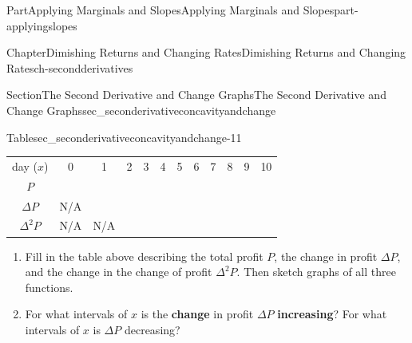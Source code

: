 \documentclass[oneside,10pt,]{tufte-book}
\newcommand{\tabularfont}{\relax}
\newcommand{\terminology}[1]{\textbf{#1}}
\numberwithin{equation}{chapter}
\def \tikzhistogram (#1,#2){\draw[fill=blue,opacity=0.3] ({#1+((\xtwo-\xmin)/5)},#2) rectangle ({#1-((\xtwo-\xmin)/5)},0); \draw[draw,thick] ({#1+((\xtwo-\xmin)/5)},#2) rectangle ({#1-((\xtwo-\xmin)/5)},0); \node[draw,fill=blue, circle,inner sep=2.5pt] at (#1,#2) {};}
\begin{document}
\begin{partptx}{Part}{Applying Marginals and Slopes}{}{Applying Marginals and Slopes}{}{}{part-applyingslopes}
\begin{chapterptx}{Chapter}{Dimishing Returns and Changing Rates}{}{Dimishing Returns and Changing Rates}{}{}{ch-secondderivatives}
\begin{sectionptx}{Section}{The Second Derivative and Change Graphs}{}{The Second Derivative and Change Graphs}{}{}{sec_seconderivativeconcavityandchange}
\begin{image}{0}{1}{0}{}
{
}%
\end{image}%
\begin{tableptx}{Table}{\textbf{}}{sec_seconderivativeconcavityandchange-11}{}%
\centering%
{\tabularfont%
\begin{tabular}{llllllllllll}
\multicolumn{1}{c}{day (\(x\))}&\multicolumn{1}{c}{0}&\multicolumn{1}{c}{1}&\multicolumn{1}{c}{2}&\multicolumn{1}{c}{3}&\multicolumn{1}{c}{4}&\multicolumn{1}{c}{5}&\multicolumn{1}{c}{6}&\multicolumn{1}{c}{7}&\multicolumn{1}{c}{8}&\multicolumn{1}{c}{9}&\multicolumn{1}{c}{10}\tabularnewline[0pt]
\multicolumn{1}{c}{\(P\)}&\multicolumn{1}{c}{}&\multicolumn{1}{c}{}&\multicolumn{1}{c}{}&\multicolumn{1}{c}{}&\multicolumn{1}{c}{}&\multicolumn{1}{c}{}&\multicolumn{1}{c}{}&\multicolumn{1}{c}{}&\multicolumn{1}{c}{}&\multicolumn{1}{c}{}&\multicolumn{1}{c}{}\tabularnewline[0pt]
\multicolumn{1}{c}{\(\Delta P\)}&\multicolumn{1}{c}{N\slash{}A}&\multicolumn{1}{c}{}&\multicolumn{1}{c}{}&\multicolumn{1}{c}{}&\multicolumn{1}{c}{}&\multicolumn{1}{c}{}&\multicolumn{1}{c}{}&\multicolumn{1}{c}{}&\multicolumn{1}{c}{}&\multicolumn{1}{c}{}&\multicolumn{1}{c}{}\tabularnewline[0pt]
\multicolumn{1}{c}{\(\Delta^2 P\)}&\multicolumn{1}{c}{N\slash{}A}&\multicolumn{1}{c}{N\slash{}A}&\multicolumn{1}{c}{}&\multicolumn{1}{c}{}&\multicolumn{1}{c}{}&\multicolumn{1}{c}{}&\multicolumn{1}{c}{}&\multicolumn{1}{c}{}&\multicolumn{1}{c}{}&\multicolumn{1}{c}{}&\multicolumn{1}{c}{}
\end{tabular}
}%
\end{tableptx}%
%
\begin{enumerate}
\item{}Fill in the table above describing the total profit \(P\), the change in profit \(\Delta P\), and the change in the change of profit \(\Delta^2 P\). Then sketch graphs of all three functions.%
\item{}For what intervals of \(x\) is the \terminology{change} in profit \(\Delta P\) \terminology{increasing}? For what intervals of \(x\) is \(\Delta P\) decreasing?%

\end{enumerate}
\end{sectionptx}
\end{chapterptx}
\end{partptx}
\end{document}
